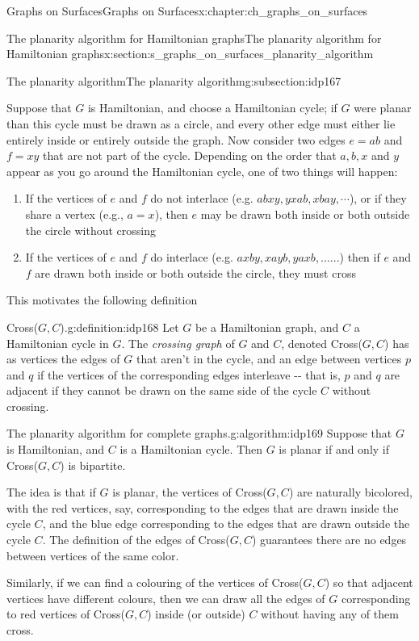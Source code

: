 \documentclass[oneside,10pt,]{book}
\numberwithin{equation}{section}
\begin{document}
\begin{chapterptx}{Graphs on Surfaces}{}{Graphs on Surfaces}{}{}{x:chapter:ch_graphs_on_surfaces}
\begin{sectionptx}{The planarity algorithm for Hamiltonian graphs}{}{The planarity algorithm for Hamiltonian graphs}{}{}{x:section:s_graphs_on_surfaces_planarity_algorithm}
\begin{subsectionptx}{The planarity algorithm}{}{The planarity algorithm}{}{}{g:subsection:idp167}
\par
Suppose that \(G\) is Hamiltonian, and choose a Hamiltonian cycle; if \(G\) were planar than this cycle must be drawn as a circle, and every other edge must either lie entirely inside or entirely outside the graph.  Now consider two edges \(e=ab\) and \(f=xy\) that are not part of the cycle.  Depending on the order that \(a,b,x\) and \(y\) appear as you go around the Hamiltonian cycle, one of two things will happen:%
\begin{enumerate}
\item{}If the vertices of \(e\) and \(f\) do not interlace (e.g. \(abxy, yxab, xbay,\cdots\)), or if they share a vertex (e.g., \(a=x\)), then \(e\) may be drawn both inside or both outside the circle without crossing%
\item{}If the vertices of \(e\) and \(f\) do interlace (e.g. \(axby, xayb, yaxb,\dots...\)) then if \(e\) and \(f\) are drawn both inside or both outside the circle, they must cross%
\end{enumerate}
%
\par
This motivates the following definition%
\begin{definition}{Cross(\(G,C\)).}{g:definition:idp168}%
Let \(G\) be a Hamiltonian graph, and \(C\) a Hamiltonian cycle in \(G\).  The \emph{crossing graph} of \(G\) and \(C\), denoted Cross(\(G,C\)) has as vertices the edges of \(G\) that aren't in the cycle, and an edge between vertices \(p\) and \(q\) if the vertices of the corresponding edges interleave -{}-{} that is, \(p\) and \(q\) are adjacent if they cannot be drawn on the same side of the cycle \(C\) without crossing.%
\end{definition}
\begin{algorithm}{The planarity algorithm for complete graphs.}{}{g:algorithm:idp169}%
Suppose that \(G\) is Hamiltonian, and \(C\) is a Hamiltonian cycle.  Then \(G\) is planar if and only if Cross(\(G,C\)) is bipartite.%
\end{algorithm}
The idea is that if \(G\) is planar, the vertices of Cross(\(G,C\)) are naturally bicolored, with the red vertices, say, corresponding to the edges that are drawn inside the cycle \(C\), and the blue edge corresponding to the edges that are drawn outside the cycle \(C\).  The definition of the edges of Cross(\(G,C\)) guarantees there are no edges between vertices of the same color.%
\par
Similarly, if we can find a colouring of the vertices of Cross(\(G,C\)) so that adjacent vertices have different colours, then we can draw all the edges of \(G\) corresponding to red vertices of Cross(\(G,C\)) inside (or outside) \(C\) without having any of them cross.%

\end{subsectionptx}
\end{sectionptx}
\end{chapterptx}
\end{document}
